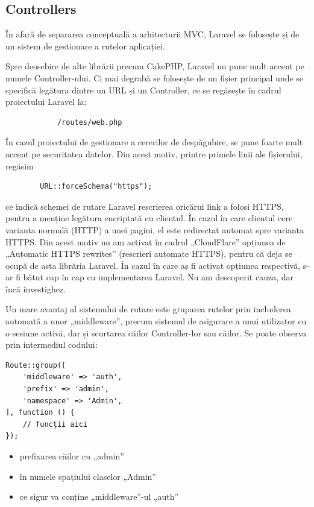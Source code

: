 \subsection{Controllers}

		În afară de separarea conceptuală a arhitecturii MVC, Laravel se folosește și de un sistem de gestionare a rutelor aplicației. \cite{laravel_controllers}

		Spre deosebire de alte librării precum CakePHP, Laravel nu pune mult accent pe numele Controller-ului.
		Ci mai degrabă se folosește de un fișier principal unde se specifică legătura dintre un URL și un Controller, ce se regăsește în cadrul proiectului Laravel la:
		\begin{verbatim}
			/routes/web.php
		\end{verbatim}

		În cazul proiectului de gestionare a cererilor de despăgubire, se pune foarte mult accent pe securitatea datelor.
		Din acest motiv, printre primele linii ale fișierului, regăsim
		\begin{verbatim}
		URL::forceSchema("https");
		\end{verbatim}
		ce indică schemei de rutare Laravel rescrierea oricărui link a folosi HTTPS, pentru a menține legătura encriptată cu clientul.
		În cazul în care clientul cere varianta normală (HTTP) a unei pagini, el este redirectat automat spre varianta HTTPS.
		Din acest motiv nu am activat în cadrul „CloudFlare” opțiunea de „Automatic HTTPS rewrites” (rescrieri automate HTTPS), pentru că deja se ocupă de asta librăria Laravel.
		În cazul în care aș fi activat opțiunea respectivă, s-ar fi bătut cap în cap cu implementarea Laravel.
		Nu am descoperit cauza, dar încă investighez.

		Un mare avantaj al sistemului de rutare este gruparea rutelor prin includerea automată a unor „middleware”, precum sistemul de asigurare a unui utilizator cu o sesiune activă, dar și scurtarea căilor Controller-lor sau căilor. Se poate observa prin intermediul codului:
\begin{Verbatim}
Route::group([
	'middleware' => 'auth',
	'prefix' => 'admin',
	'namespace' => 'Admin',
], function () {
	// funcții aici
});
\end{Verbatim}

	\label{alg:group}

	\begin{itemize}
		\item prefixarea căilor cu „admin”
		\item în numele spațiului claselor „Admin”
		\item ce sigur va conține „middleware”-ul „auth”
	\end{itemize}

